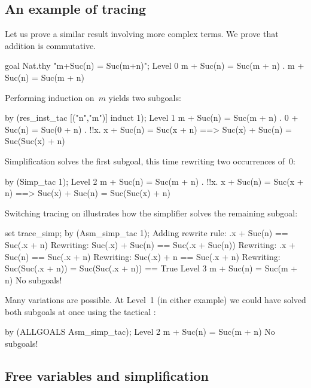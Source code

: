 \subsection{An example of tracing}

Let us prove a similar result involving more complex terms.  We prove
that addition is commutative.
\begin{ttbox}
goal Nat.thy "m+Suc(n) = Suc(m+n)";
{\out Level 0}
{\out m + Suc(n) = Suc(m + n)}
{. m + Suc(n) = Suc(m + n)}
\end{ttbox}
Performing induction on~$m$ yields two subgoals:
\begin{ttbox}
by (res_inst_tac [("n","m")] induct 1);
{\out Level 1}
{\out m + Suc(n) = Suc(m + n)}
{. 0 + Suc(n) = Suc(0 + n)}
{. !!x. x + Suc(n) = Suc(x + n) ==>}
{\out          Suc(x) + Suc(n) = Suc(Suc(x) + n)}
\end{ttbox}
Simplification solves the first subgoal, this time rewriting two
occurrences of~0:
\begin{ttbox}
by (Simp_tac 1);
{\out Level 2}
{\out m + Suc(n) = Suc(m + n)}
{. !!x. x + Suc(n) = Suc(x + n) ==>}
{\out          Suc(x) + Suc(n) = Suc(Suc(x) + n)}
\end{ttbox}
Switching tracing on illustrates how the simplifier solves the remaining
subgoal: 
\begin{ttbox}
set trace_simp;
by (Asm_simp_tac 1);
\ttbreak
{\out Adding rewrite rule:}
{\out .x + Suc(n) == Suc(.x + n)}
\ttbreak
{\out Rewriting:}
{\out Suc(.x) + Suc(n) == Suc(.x + Suc(n))}
\ttbreak
{\out Rewriting:}
{\out .x + Suc(n) == Suc(.x + n)}
\ttbreak
{\out Rewriting:}
{\out Suc(.x) + n == Suc(.x + n)}
\ttbreak
{\out Rewriting:}
{\out Suc(Suc(.x + n)) = Suc(Suc(.x + n)) == True}
\ttbreak
{\out Level 3}
{\out m + Suc(n) = Suc(m + n)}
{\out No subgoals!}
\end{ttbox}
Many variations are possible.  At Level~1 (in either example) we could have
solved both subgoals at once using the tactical :
\begin{ttbox}
by (ALLGOALS Asm_simp_tac);
{\out Level 2}
{\out m + Suc(n) = Suc(m + n)}
{\out No subgoals!}
\end{ttbox}


\subsection{Free variables and simplification}

